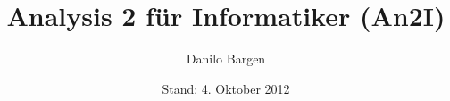 


\subject{Hochschule für Technik Rapperswil}
\title{Analysis 2 für Informatiker (An2I)}
\author{Danilo Bargen}
\date{Stand: 4. Oktober 2012}
















